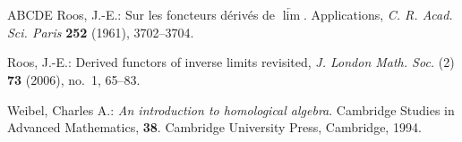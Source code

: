 \documentclass[reqno,11pt]{amsart}
\theoremstyle{plain}
\theoremstyle{remark}
\theoremstyle{definition}
\numberwithin{equation}{thm}
\begin{document}
\begin{thebibliography}{ABCDE}
 Roos, J.-E.: Sur les foncteurs d\'eriv\'es de $\underleftarrow\lim$. Applications, \textit{C. R. Acad. Sci. Paris} {\bf 252} (1961), 3702--3704.
		
 Roos, J.-E.: Derived functors of inverse limits revisited, \textit{J. London Math. Soc.} (2) {\bf 73} (2006), no.~1, 65--83.
		
		
		
		
		
		
		
		
		
		
 Weibel, Charles A.: \textit{An introduction to homological algebra}.
		Cambridge Studies in Advanced Mathematics, \textbf{38}. Cambridge University Press,
		Cambridge, 1994.
		
\end{thebibliography}
	
\end{document}
